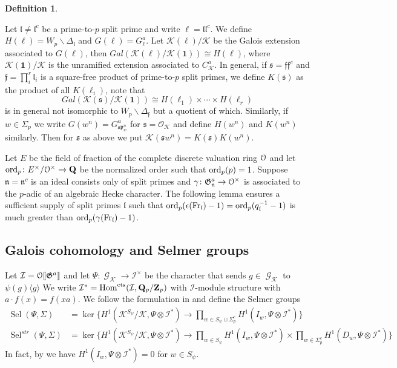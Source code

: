 \documentclass[leqno]{amsart}
\theoremstyle{definition}
\newtheorem{defn}[thm]{Definition}
\theoremstyle{remark}
\newcommand{\id}{\mathbf{1}}
\newcommand{\oo}{\mathcal{O}}
\newcommand{\eo}{\EuScript{O}}
\newcommand{\Q}{{\mathbf{Q}}}
\newcommand{\Qp}{\mathbf{Q}_p}
\newcommand{\Zp}{\mathbf{Z}_p}
\DeclareMathOperator{\Hom}{Hom}
\DeclareMathOperator{\Gal}{\mathcal{G}}
\newcommand{\Fr}{\textnormal{Fr}} %
\newcommand{\cts}{\textnormal{cts}}
\newcommand{\ff}{\mathfrak{f}}
\newcommand{\fl}{\mathfrak{l}}
\newcommand{\fn}{\mathfrak{n}}
\newcommand{\fp}{\mathfrak{p}}
\newcommand{\fs}{\mathfrak{s}}
\newcommand{\K}{{\mathcal{K}}} %
\newcommand{\fG}{\mathfrak{G}}
\newcommand{\I}{\mathcal{I}} %
\newcommand{\ord}{\textnormal{ord}} %
\DeclareMathOperator{\Sel}{Sel}
\begin{document}
\begin{defn}\label{def:anticyc_extn}

Let $\fl\neq \fl^c$
be a prime-to-$p$ split prime
and write $\ell=\fl\fl^c$.
We define $H(\ell)=W_p\backslash\Delta_\fl$ and 
$G(\ell)=G_\ell^a$.
Let $\K(\ell)/\K$
be the Galois extension associated to $G(\ell)$, then 
$Gal(\K(\ell)/\K(\id))\cong H(\ell)$,
where $\K(\id)/\K$
is the unramified extension associated to $C_\K^a$.
In general,
if $\fs=\ff\ff^c$
and $\ff=\prod_i^r\fl_i$
is a square-free product of prime-to-$p$ split primes,
we define $K(\fs)$
as the product of all $K(\ell_i)$,
note that 
\[
    Gal(\K(\fs)/\K(\id))\cong 
    H(\ell_1)\times\cdots\times H(\ell_r)
\]
is in general not isomorphic to 
$W_p\backslash \Delta_\ff$
but a quotient of which.
Similarly, if $w\in \Sigma_p$
we write $G(w^n)=G_{\fs\fp_w^n}^a$
for $\fs=\oo_\K$ and
define $H(w^n)$ and $K(w^n)$ similarly.
Then for $\fs$ as above
we put $\K(\fs w^n)=K(\fs)K(w^n)$.

\end{defn}

Let $E$ be the field of fraction
of the complete discrete valuation ring
$\eo$ and let 
$\ord_p\colon E^\times/\eo^\times\to \Q$
be the normalized order
such that $\ord_p(p)=1$.
Suppose $\fn=\fn^c$ is an ideal
consists only of split primes 
and $\gamma\colon \fG_\fn^a\to \eo^\times$
is associated to the $p$-adic
of an algebraic Hecke character.
The following lemma ensures 
a sufficient supply of split primes $\fl$ such that 
$\ord_p(\epsilon(\Fr_\fl)-1)=\ord_p(q_\fl^{-1}-1)$
is much greater than 
$\ord_p(\gamma(\Fr_\fl)-1)$.

\subsection{Galois cohomology and Selmer groups}

Let $\I=\eo\llbracket \fG^a\rrbracket$
and let $\Psi\colon \Gal_\K\to \I^\times$
be the character that sends
$g\in \Gal_\K$ to $\psi(g)\langle g\rangle$
We write 
$\I^*=\Hom^{\cts}(\I, \Qp/\Zp)$
with $\I$-module structure with 
$a\cdot f(x)=f(xa)$.
We follow the formulation in 
\cite{Hsieh2010} and define 
the Selmer groups 
\begin{align*}
\Sel(\Psi,\Sigma)&=
\ker\big\{
H^1(\K^{S_\psi}/\K,\Psi\otimes \I^*)\to 
\prod_{w\in S_\psi\sqcup \Sigma^c_p}
H^1(I_w,\Psi\otimes \I^*)
\big\}\\
\Sel^{str}(\Psi,\Sigma)&=
\ker\big\{
H^1(\K^{S_\psi}/\K,\Psi\otimes \I^*)\to 
\prod_{w\in S_\psi}
H^1(I_w,\Psi\otimes \I^*)\times
\prod_{w\in \Sigma^c_p}
H^1(D_w,\Psi\otimes \I^*)
\big\}
\end{align*}
In fact, 
by \cite[Lem 2.7]{Hsieh2010}
we have
$H^1(I_w,\Psi\otimes \I^*)=0$
for $w\in S_\psi$.
\end{document}
